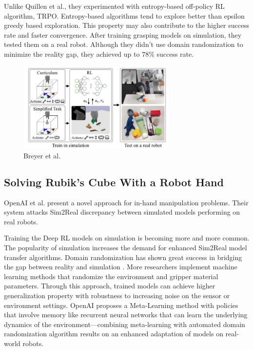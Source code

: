 Unlike Quillen et al., they experimented with entropy-based off-policy RL algorithm, TRPO. Entropy-based algorithms tend to explore better than epsilon greedy based exploration. This property may also contribute to the higher success rate and faster convergence. After training grasping models on simulation, they tested them on a real robot. Although they didn’t use domain randomization to minimize the reality gap, they achieved up to \(78\%\) success rate.

\begin{figure}[htbp]
    \centering
    \includegraphics[width=0.7\textwidth]{figures/curriculum}
    \caption{Breyer et al. \cite{Breyer2018}}
    \label{fig:dql}
\end{figure}


\subsection{Solving Rubik's Cube With a Robot Hand}

OpenAI et al. present a novel approach for in-hand manipulation problems. Their system attacks Sim2Real discrepancy between simulated models performing on real robots. 

Training the Deep RL models on simulation is becoming more and more common. The popularity of simulation increases the demand for enhanced Sim2Real model transfer algorithms. Domain randomization has shown great success in bridging the gap between reality and simulation \cite{Tobin2017}. More researchers implement machine learning methods that randomize the environment and gripper material parameters. Through this approach, trained models can achieve higher generalization property with robustness to increasing noise on the sensor or environment settings.
OpenAI proposes a Meta-Learning method with policies that involve memory like recurrent neural networks that can learn the underlying dynamics of the environment—combining meta-learning with automated domain randomization algorithm results on an enhanced adaptation of models on real-world robots.

